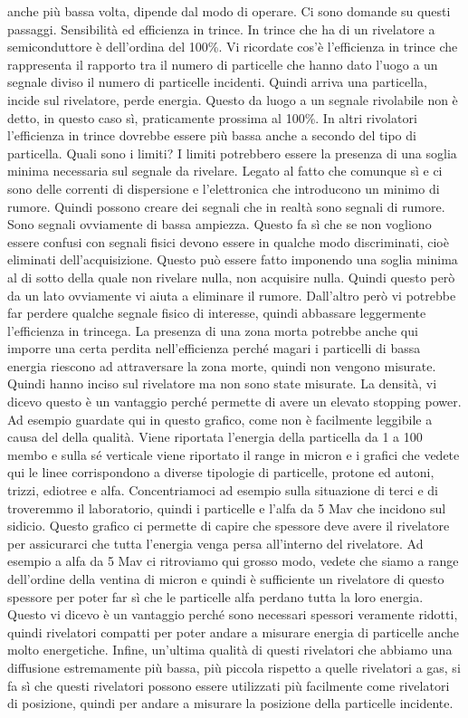 anche più bassa volta, dipende dal modo di operare. Ci sono domande su questi passaggi. Sensibilità ed efficienza in trince. In trince che ha di un rivelatore a semiconduttore è dell'ordina del 100\%. Vi ricordate cos'è l'efficienza in trince che rappresenta il rapporto tra il numero di particelle che hanno dato l'uogo a un segnale diviso il numero di particelle incidenti. Quindi arriva una particella, incide sul rivelatore, perde energia. Questo da luogo a un segnale rivolabile non è detto, in questo caso sì, praticamente prossima al 100\%. In altri rivolatori l'efficienza in trince dovrebbe essere più bassa anche a secondo del tipo di particella. Quali sono i limiti? I limiti potrebbero essere la presenza di una soglia minima necessaria sul segnale da rivelare. Legato al fatto che comunque sì e ci sono delle correnti di dispersione e l'elettronica che introducono un minimo di rumore. Quindi possono creare dei segnali che in realtà sono segnali di rumore. Sono segnali ovviamente di bassa ampiezza. Questo fa sì che se non vogliono essere confusi con segnali fisici devono essere in qualche modo discriminati, cioè eliminati dell'acquisizione. Questo può essere fatto imponendo una soglia minima al di sotto della quale non rivelare nulla, non acquisire nulla. Quindi questo però da un lato ovviamente vi aiuta a eliminare il rumore. Dall'altro però vi potrebbe far perdere qualche segnale fisico di interesse, quindi abbassare leggermente l'efficienza in trincega. La presenza di una zona morta potrebbe anche qui imporre una certa perdita nell'efficienza perché magari i particelli di bassa energia riescono ad attraversare la zona morte, quindi non vengono misurate. Quindi hanno inciso sul rivelatore ma non sono state misurate. La densità, vi dicevo questo è un vantaggio perché permette di avere un elevato stopping power. Ad esempio guardate qui in questo grafico, come non è facilmente leggibile a causa del della qualità. Viene riportata l'energia della particella da 1 a 100 membo e sulla sé verticale viene riportato il range in micron e i grafici che vedete qui le linee corrispondono a diverse tipologie di particelle, protone ed autoni, trizzi, ediotree e alfa. Concentriamoci ad esempio sulla situazione di terci e di troveremmo il laboratorio, quindi i particelle e l'alfa da 5 Mav che incidono sul sidicio. Questo grafico ci permette di capire che spessore deve avere il rivelatore per assicurarci che tutta l'energia venga persa all'interno del rivelatore. Ad esempio a alfa da 5 Mav ci ritroviamo qui grosso modo, vedete che siamo a range dell'ordine della ventina di micron e quindi è sufficiente un rivelatore di questo spessore per poter far sì che le particelle alfa perdano tutta la loro energia. Questo vi dicevo è un vantaggio perché sono necessari spessori veramente ridotti, quindi rivelatori compatti per poter andare a misurare energia di particelle anche molto energetiche. Infine, un'ultima qualità di questi rivelatori che abbiamo una diffusione estremamente più bassa, più piccola rispetto a quelle rivelatori a gas, si fa sì che questi rivelatori possono essere utilizzati più facilmente come rivelatori di posizione, quindi per andare a misurare la posizione della particelle incidente.

